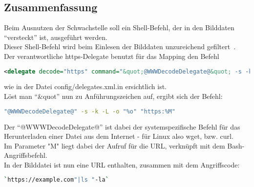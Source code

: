 \subsection{Zusammenfassung}\label{subsec:zusammenfassung}

Beim Ausnutzen der Schwachstelle soll ein Shell-Befehl, der in den Bilddaten "`versteckt"' ist, ausgeführt werden.\\
Dieser Shell-Befehl wird beim Einlesen der Bilddaten unzureichend gefiltert~\cite{TechnicalAnalysisImageTragick1000}.\\

Der verantwortliche https-Delegate benutzt für das Mapping den Befehl\\

\begin{lstlisting}[firstnumber=91, language=XML, caption=config/delegates.xml.in https-Delegate,label={lst:lstlisting}]
  <delegate decode="https" command="&quot;@WWWDecodeDelegate@&quot; -s -k -L -o &quot;%o&quot; &quot;https:%M&quot;"/>
\end{lstlisting}
\vspace{5mm}

wie in der Datei config/delegates.xml.in ersichtlich ist.\\

Löst man "`\&quot"' nun zu Anführungszeichen auf, ergibt sich der Befehl:\\
\begin{lstlisting}[firstnumber=1, language=Bash, caption=Aufgelöster https-Delegate-Befehl,label={lst:lstlisting}]
"@WWWDecodeDelegate@" -s -k -L -o "%o" "https:%M"
\end{lstlisting}
\vspace{5mm}

Der "`@WWWDecodeDelegate@"' ist dabei der systemspezifische Befehl für das Herunterladen einer Datei aus dem Internet - für Linux also wget, bzw. curl.\\
Im Parameter "M" liegt dabei der Aufruf für die URL, verknüpft mit dem Bash-Angriffsbefehl.\\

In der Bilddatei ist nun eine URL enthalten, zusammen mit dem Angriffscode:\\

\begin{lstlisting}[firstnumber=91, language=Bash, caption=Beispielhafter Inhalt einer Angriffsdatei,label={lst:lstlisting}]
`https://example.com"|ls "-la`
\end{lstlisting}
\vspace{5mm}

